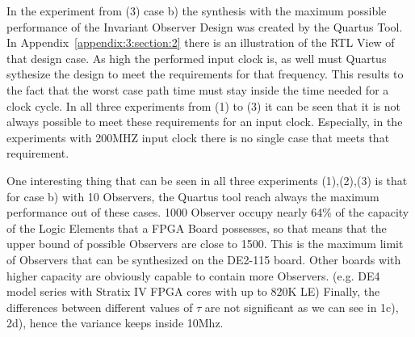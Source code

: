 In the experiment from (3) case b) the synthesis with the maximum possible performance of the Invariant Observer Design was created by the Quartus Tool.
In Appendix~\ref{appendix:3:section:2} there is an illustration of the RTL View of that design case.
As high the performed input clock is, as well must Quartus sythesize the design to meet the requirements for that frequency. 
This results to the fact that the worst case path time must stay inside the time needed for a clock cycle. 
In all three experiments from (1) to (3) it can be seen that it is not always possible to meet these requirements for an input clock. 
Especially, in the experiments with 200MHZ input clock there is no single case that meets that requirement. 
  
One interesting thing that can be seen in all three experiments (1),(2),(3) is that for case b) with 10 Observers, 
the Quartus tool reach always the maximum performance out of these cases.
1000 Observer occupy nearly 64\% of the capacity of the Logic Elements that a FPGA Board possesses, so that means that the upper bound of possible Observers are close to 1500.
This is the maximum limit of Observers that can be synthesized on the DE2-115 board. 
Other boards with higher capacity are obviously capable to contain more Observers. (e.g. DE4 model series with Stratix IV FPGA cores with up to 820K LE)
Finally, the differences between different values of $\tau$ are not significant as we can see in 1c), 2d), hence the variance keeps inside 10Mhz.

